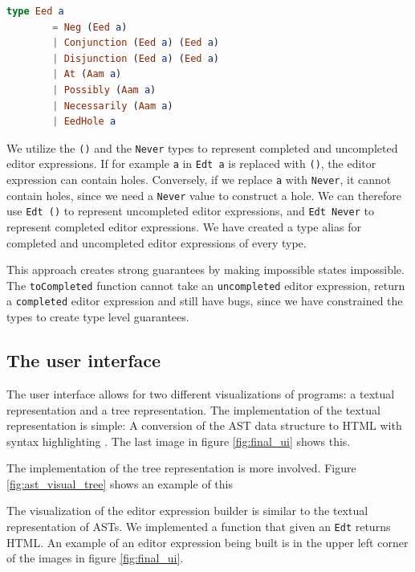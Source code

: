 \begin{lstlisting}[language=elm,%
                   label="eed-definitions",%
                   gobble=4,%
                   ]
    type Eed a
        = Neg (Eed a)
        | Conjunction (Eed a) (Eed a)
        | Disjunction (Eed a) (Eed a)
        | At (Aam a)
        | Possibly (Aam a)
        | Necessarily (Aam a)
        | EedHole a
\end{lstlisting}

We utilize the \texttt{()} and the \texttt{Never} types to represent
completed and uncompleted editor expressions. If for example \texttt{a} in
\texttt{Edt a} is replaced with \texttt{()}, the editor expression can contain
holes. Conversely, if we replace \texttt{a} with \texttt{Never}, it cannot
contain holes, since we need a \texttt{Never} value to construct a hole. We can
therefore use \texttt{Edt ()} to represent uncompleted editor expressions, and
\texttt{Edt Never} to represent completed editor expressions. We have created a
type alias for completed and uncompleted editor expressions of every type.

This approach creates strong guarantees by making impossible states impossible.
The \texttt{toCompleted} function cannot take an \texttt{uncompleted} editor
expression, return a \texttt{completed} editor expression and still have bugs,
since we have constrained the types to create type level guarantees.

\subsection{The user interface}
\label{user-interface}

The user interface allows for two different visualizations of
programs: a textual representation and a tree representation. The
implementation of the textual representation is simple: A conversion
of the AST data structure to HTML with syntax highlighting . The last
image in figure \ref{fig:final_ui} shows this.

The implementation of the tree representation is more involved. Figure
\ref{fig:ast_visual_tree} shows an example of this

The visualization of the editor expression builder is similar to the textual
representation of ASTs. We implemented a function that given an \texttt{Edt}
returns HTML. An example of an
editor expression being built is in the upper left corner of the images in
figure \ref{fig:final_ui}.


